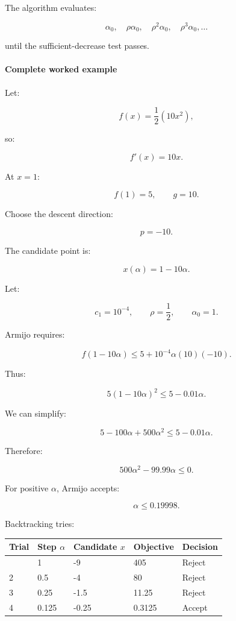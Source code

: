 The algorithm evaluates:

\[
\alpha_0,\quad \rho\alpha_0,\quad \rho^2\alpha_0,\quad \rho^3\alpha_0,\ldots
\]

until the sufficient-decrease test passes.

\paragraph{Complete worked example}\label{02-foundations-ii-ch026-complete-worked-example}

\hypertarget{02-foundations-ii-ch026-complete-worked-example}{}

Let:

\[
f(x)=\frac12(10x^2),
\]

so:

\[
f'(x)=10x.
\]

At \(x=1\):

\[
f(1)=5,\qquad g=10.
\]

Choose the descent direction:

\[
p=-10.
\]

The candidate point is:

\[
x(\alpha)=1-10\alpha.
\]

Let:

\[
c_1=10^{-4},\qquad\rho=\frac12,\qquad\alpha_0=1.
\]

Armijo requires:

\[
f(1-10\alpha) \le 5+10^{-4}\alpha(10)(-10).
\]

Thus:

\[
5(1-10\alpha)^2\le5-0.01\alpha.
\]

We can simplify:

\[
5-100\alpha+500\alpha^2 \le5-0.01\alpha.
\]

Therefore:

\[
500\alpha^2-99.99\alpha\le0.
\]

For positive \(\alpha\), Armijo accepts:

\[
\boxed{\alpha\le0.19998}.
\]

Backtracking tries:

{\def\LTcaptype{none} %
\begin{longtable}[]{@{}lllll@{}}
\toprule\noalign{}
Trial & Step \(\alpha\) & Candidate \(x\) & Objective & Decision \\
\midrule\noalign{}
\endhead
\bottomrule\noalign{}
\endlastfoot
1 & 1 & -9 & 405 & Reject \\
2 & 0.5 & -4 & 80 & Reject \\
3 & 0.25 & -1.5 & 11.25 & Reject \\
4 & 0.125 & -0.25 & 0.3125 & Accept \\
\end{longtable}
}

